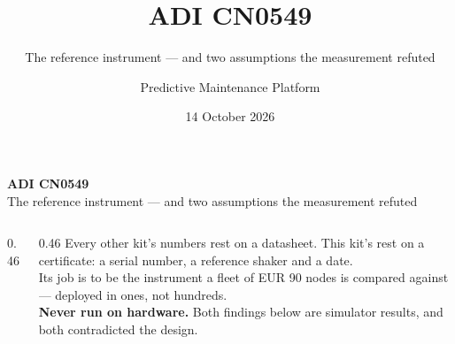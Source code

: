 \documentclass[aspectratio=169,10pt]{beamer}
\title[CN0549]{ADI CN0549}
\subtitle{The reference instrument --- and two assumptions the measurement refuted}
\author{Predictive Maintenance Platform}
\date{14 October 2026}
\begin{document}
\begin{frame}[plain]
  \vspace{5mm}
  {\LARGE\bfseries ADI CN0549}\\[2mm]
  {\large\color{pdmink2} The reference instrument --- and two assumptions the
   measurement refuted}\par
  \vspace{5mm}\noindent{\color{pdmrule}\rule{\linewidth}{0.4pt}}\par
  \vspace{3mm}
  \begin{columns}[T]
    \begin{column}{0.46\textwidth}
      \scriptsize
      \\[1mm]
      \\[1mm]
      \\[1mm]
      \\[1mm]
      \\[1mm]
    \end{column}
    \begin{column}{0.46\textwidth}
      \scriptsize\color{pdmink2}
      Every other kit's numbers rest on a datasheet. This kit's rest on a
      certificate: a serial number, a reference shaker and a date.
      \\[2mm]
      Its job is to be the instrument a fleet of EUR 90 nodes is compared
      against --- deployed in ones, not hundreds.
      \\[2mm]
      \textbf{Never run on hardware.} Both findings below are simulator
      results, and both contradicted the design.
    \end{column}
  \end{columns}
\end{frame}
\end{document}
